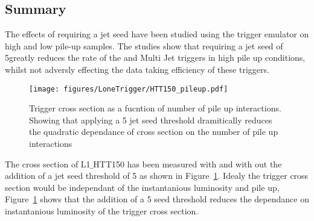 
\subsection{Summary} %
\label{sec:Summary}
The effects of requiring a jet seed have been studied using the \Lone trigger 
emulator on high and low pile-up samples. The studies show that requiring a jet 
seed of 5\GeV greatly reduces the rate of the \HT and Multi Jet triggers in 
high pile up conditions, whilst not adversly effecting the data taking 
efficiency of these triggers.

\begin{figure}[ht]
  \centering
    \texttt{[image: figures/LoneTrigger/HTT150\_pileup.pdf]}
  \caption{Trigger cross section as a fucntion of number of pile up 
  interactions. Showing that applying a 5 \GeV jet seed threshold dramitically 
  reduces the quadratic dependance of cross section on the number of pile up 
  interactions}
  \label{fig:figures_HTT150_pileup}
\end{figure}

The cross section of L1$\_$HTT150 has been measured with and with out the 
addition of a jet seed threshold of 5 \GeV as shown in  
Figure~\ref{fig:figures_HTT150_pileup}. Idealy the trigger cross section would 
be independant of the instantanious luminosity and pile up, 
Figure~\ref{fig:figures_HTT150_pileup} shows that the addition of a 5 \GeV seed 
threshold reduces the dependance on instantanious luminosity of the trigger 
cross section.


